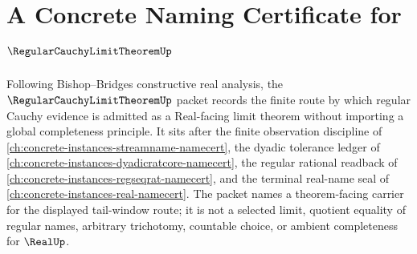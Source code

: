\chapter{A Concrete Naming Certificate for $\RegularCauchyLimitTheoremUp$}
\label{ch:concrete-instances-regular-cauchy-limit-theorem-namecert}

Following Bishop--Bridges constructive real analysis, the $\RegularCauchyLimitTheoremUp$ packet records the finite route by which regular Cauchy evidence is admitted as a Real-facing limit theorem without importing a global completeness principle. It sits after the finite observation discipline of \autoref{ch:concrete-instances-streamname-namecert}, the dyadic tolerance ledger of \autoref{ch:concrete-instances-dyadicratcore-namecert}, the regular rational readback of \autoref{ch:concrete-instances-regseqrat-namecert}, and the terminal real-name seal of \autoref{ch:concrete-instances-real-namecert}. The packet names a theorem-facing carrier for the displayed tail-window route; it is not a selected limit, quotient equality of regular names, arbitrary trichotomy, countable choice, or ambient completeness for $\RealUp$.

